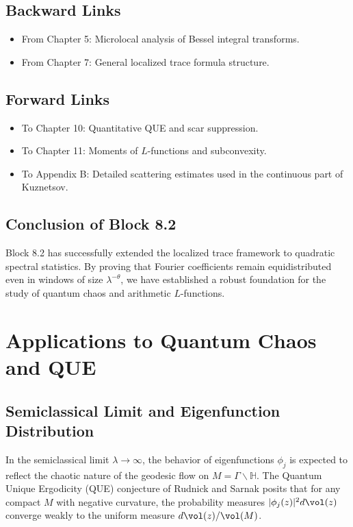 \subsection*{Backward Links}
\begin{itemize}
    \item From Chapter 5: Microlocal analysis of Bessel integral transforms.
    \item From Chapter 7: General localized trace formula structure.
\end{itemize}

\subsection*{Forward Links}
\begin{itemize}
    \item To Chapter 10: Quantitative QUE and scar suppression.
    \item To Chapter 11: Moments of $L$-functions and subconvexity.
    \item To Appendix B: Detailed scattering estimates used in the continuous part of Kuznetsov.
\end{itemize}

\subsection*{Conclusion of Block 8.2}
Block 8.2 has successfully extended the localized trace framework to quadratic spectral statistics. By proving that Fourier coefficients remain equidistributed even in windows of size $\lambda^{-\theta}$, we have established a robust foundation for the study of quantum chaos and arithmetic $L$-functions.


\section{Applications to Quantum Chaos and QUE}\label{sec:quantumchaos}

\subsection{Semiclassical Limit and Eigenfunction Distribution}

In the semiclassical limit $\lambda \to \infty$, the behavior of eigenfunctions $\phi_j$ is expected to reflect the chaotic nature of the geodesic flow on $M = \Gamma \backslash \mathbb{H}$. The Quantum Unique Ergodicity (QUE) conjecture of Rudnick and Sarnak posits that for any compact $M$ with negative curvature, the probability measures $|\phi_j(z)|^2 d\vol(z)$ converge weakly to the uniform measure $d\vol(z) / \vol(M)$.

